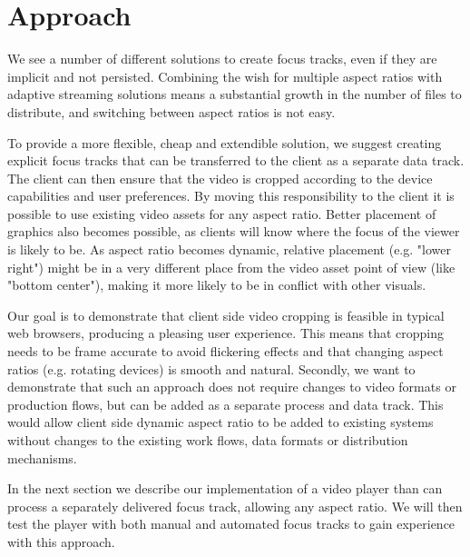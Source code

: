 \documentclass[sigconf, review=true]{acmart}
\begin{document}
\section{Approach}

We see a number of different solutions to create focus tracks, even if they
are implicit and not persisted. Combining the wish for multiple aspect ratios
with adaptive streaming solutions means a substantial growth in the number of
files to distribute, and switching between aspect ratios is not easy.

To provide a more flexible, cheap and extendible solution, we suggest creating
explicit focus tracks that can be transferred to the client as a separate
data track. The client can then ensure that the video is cropped according to
the device capabilities and user preferences. By moving this responsibility
to the client it is possible to use existing video assets for any aspect
ratio. Better placement of graphics also becomes possible, as clients will
know where the focus of the viewer is likely to be. As aspect ratio becomes
dynamic, relative placement (e.g. "lower right") might be in a very different
place from the video asset point of view (like "bottom center"), making it
more likely to be in conflict with other visuals. 

Our goal is to demonstrate that client side video cropping is feasible in
typical web browsers, producing a pleasing user experience. This means that
cropping needs to be frame accurate to avoid flickering effects and that
changing aspect ratios (e.g. rotating devices) is smooth and natural.
Secondly, we want to demonstrate that such an approach does not require
changes to video formats or production flows, but can be added as a separate
process and data track. This would allow client side dynamic aspect ratio to
be added to existing systems without changes to the existing work flows, data
formats or distribution mechanisms.

In the next section we describe our implementation of a video player than can
process a separately delivered focus track, allowing any aspect ratio. We
will then test the player with both manual and automated focus tracks to gain
experience with this approach.

\end{document}
